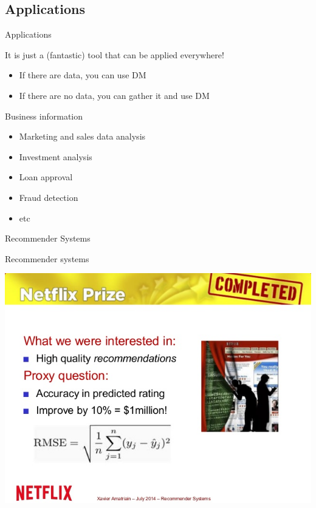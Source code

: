 \documentclass{beamer}
\begin{document}
\subsection{Applications}

\begin{frame}{Applications}

It is just a (fantastic) tool that can be applied everywhere!
\begin{itemize}
    \item If there are data, you can use DM
    \item If there are no data, you can gather it and use DM
\end{itemize}

Business information

\begin{itemize}
 \item Marketing and sales data analysis
 \item Investment analysis
 \item Loan approval
 \item Fraud detection
 \item etc
\end{itemize}

\end{frame}


\begin{frame}{Recommender Systems}

Recommender systems

\begin{center}
\includegraphics[width=.7\textwidth]{figs/recommender-systems}
\end{center}

\end{frame}
\end{document}
